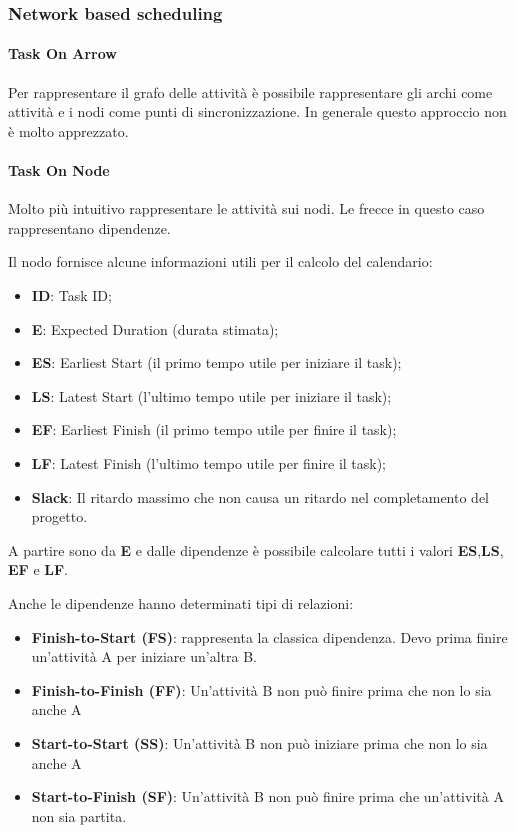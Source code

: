 \subsubsection{Network based scheduling}
\paragraph{Task On Arrow}
Per rappresentare il grafo delle attività è possibile rappresentare gli archi come attività e i nodi come punti di sincronizzazione. In generale questo approccio non è molto apprezzato.
\paragraph{Task On Node}
Molto più intuitivo rappresentare le attività sui nodi. Le frecce in questo caso rappresentano dipendenze.

\noindent Il nodo fornisce alcune informazioni utili per il calcolo del calendario:
\begin{itemize}
	\item \textbf{ID}: Task ID;
	\item \textbf{E}: Expected Duration (durata stimata);
	\item \textbf{ES}: Earliest Start (il primo tempo utile per iniziare il task);
	\item \textbf{LS}: Latest Start (l'ultimo tempo utile per iniziare il task);
	\item \textbf{EF}: Earliest Finish (il primo tempo utile per finire il task);
	\item \textbf{LF}: Latest Finish (l'ultimo tempo utile per finire il task);
	\item \textbf{Slack}: Il ritardo massimo che non causa un ritardo nel completamento del progetto.
\end{itemize}
A partire sono da \textbf{E} e dalle dipendenze è possibile calcolare tutti i valori \textbf{ES},\textbf{LS}, \textbf{EF} e \textbf{LF}.

\noindent Anche le dipendenze hanno determinati tipi di relazioni:
\begin{itemize}
	\item \textbf{Finish-to-Start (FS)}: rappresenta la classica dipendenza. Devo prima finire un'attività A per iniziare un'altra B.
	\item \textbf{Finish-to-Finish (FF)}: Un'attività B non può finire prima che non lo sia anche A
	\item \textbf{Start-to-Start (SS)}: Un'attività B non può iniziare prima che non lo sia anche A
	\item \textbf{Start-to-Finish (SF)}: Un'attività B non può finire prima che un'attività A non sia partita.
\end{itemize}

